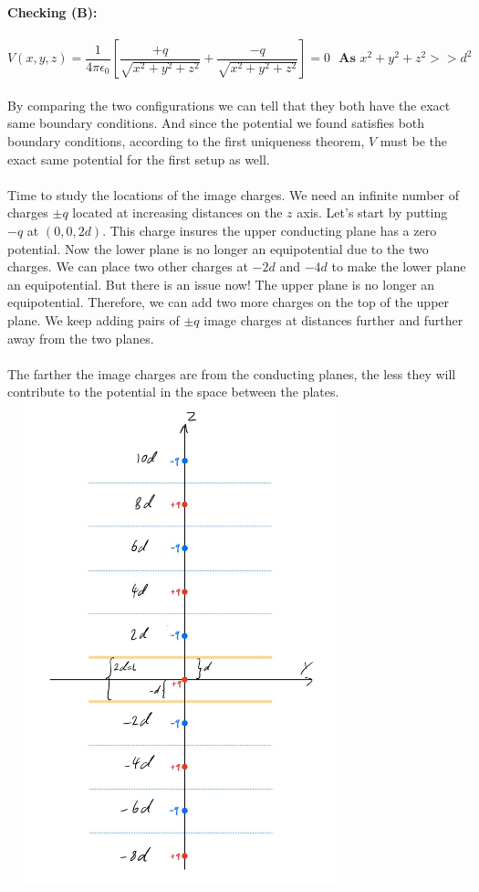 \documentclass[fleqn]{article}
\begin{document}
\begin{enumerate}
{        \textbf{Checking (B):}
        \\
        \\
        $
          V(x, y, z)=\dfrac{1}{4 \pi \epsilon_0} \left[
            \dfrac{+q}{\sqrt{x^2+y^2+z^2}}
            +\dfrac{-q}{\sqrt{x^2+y^2+z^2}}
          \right]=0 ~~~ \textbf{As $x^2+y^2+z^2 >> d^2$}
        $
        \\
        \\
        By comparing the two configurations we can tell that they both have the exact same boundary conditions. And since 
        the potential we found satisfies both boundary conditions, according to the first uniqueness theorem, $V$ must be 
        the exact same potential for the first setup as well.
        \\
        \\
        Time to study the locations of the image charges. We need an infinite number of charges $\pm q$ located at increasing
        distances on the $z$ axis. Let's start by putting $-q$ at $(0, 0, 2d)$. This charge insures the upper conducting plane
        has a zero potential. Now the lower plane is no longer an equipotential due to the two charges. We can place two other 
        charges at $-2d$ and $-4d$ to make the lower plane an equipotential. But there is an issue now! The upper plane is no longer
        an equipotential. Therefore, we can add two more charges on the top of the upper plane. We keep adding pairs of 
        $\pm q$ image charges at distances further and further away from the two planes. 
        \\
        \\
        The farther the image charges are from the conducting planes, the less they will contribute to the potential in 
        the space between the plates.
        \\
        \includegraphics[height=14cm, width=10cm]{Five.JPG}
        \\
      }


\end{enumerate}
\end{document}
